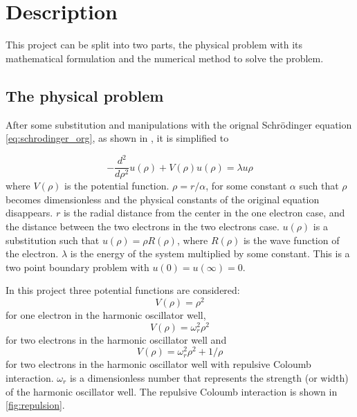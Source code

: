 \documentclass{article}
\begin{document}
\section{Description}
\label{sec:description}
This project can be split into two parts, the physical problem with its mathematical formulation and the numerical method to solve the problem.
\subsection{The physical problem}
After some substitution and manipulations with the orignal Schr\"odinger equation \ref{eq:schrodinger_org}, as shown in \cite{lectures}, it is simplified to 

\begin{equation}
-\frac{d^2}{d\rho^2}u(\rho) + V(\rho)u(\rho) = \lambda u{\rho}
\label{eq:schrodinger}
\end{equation}
where $V(\rho)$ is the potential function. $\rho=r/\alpha$, for some constant $\alpha$ such that $\rho$ becomes dimensionless and the physical constants of the original equation disappears. $r$ is the radial distance from the center in the one electron case, and the distance between the two electrons in the two electrons case. $u(\rho)$ is a substitution such that $u(\rho)=\rho R(\rho)$, where $R(\rho)$ is the wave function of the electron. $\lambda$ is the energy of the system multiplied by some constant. This is a two point boundary problem with $u(0)=u(\infty)=0$.

In this project three potential functions are considered:
\begin{equation}
V(\rho)=\rho^2
\end{equation}
for one electron in the harmonic oscillator well,
\begin{equation}
V(\rho)=\omega_r^2\rho^2
\end{equation}
for two electrons in the harmonic oscillator well and 
\begin{equation}
V(\rho)=\omega_r^2\rho^2 + 1/\rho
\end{equation}
for two electrons in the harmonic oscillator well with repulsive Coloumb interaction. $\omega_r$ is a dimensionless number that represents the strength (or width) of the harmonic oscillator well. The repulsive Coloumb interaction is shown in \ref{fig:repulsion}. 
\end{document}

